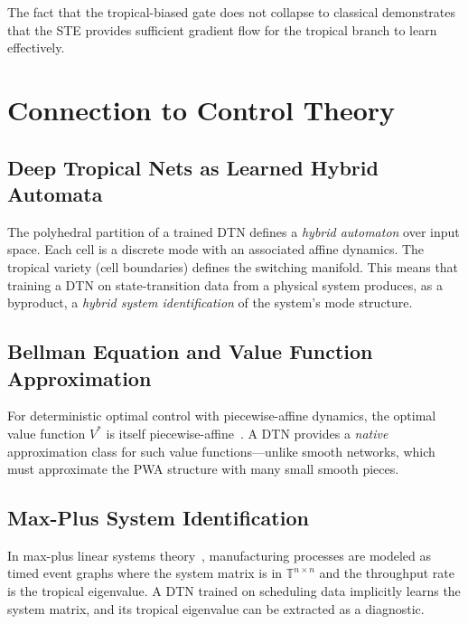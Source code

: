 \documentclass[11pt,twocolumn]{article}
\newcommand{\T}{\mathbb{T}}
\begin{document}
The fact that the tropical-biased gate does not collapse to classical
demonstrates that the STE provides sufficient gradient flow for the tropical
branch to learn effectively.

\section{Connection to Control Theory}\label{sec:control}

\subsection{Deep Tropical Nets as Learned Hybrid Automata}

The polyhedral partition of a trained DTN defines a \emph{hybrid automaton}
over input space. Each cell is a discrete mode with an associated affine
dynamics. The tropical variety (cell boundaries) defines the switching
manifold. This means that training a DTN on state-transition data from a
physical system produces, as a byproduct, a \emph{hybrid system identification}
of the system's mode structure.

\subsection{Bellman Equation and Value Function Approximation}

For deterministic optimal control with piecewise-affine dynamics, the optimal
value function $V^*$ is itself
piecewise-affine~\cite{borrelli2017predictive}. A DTN provides a
\emph{native} approximation class for such value functions---unlike smooth
networks, which must approximate the PWA structure with many small smooth
pieces.

\subsection{Max-Plus System Identification}

In max-plus linear systems theory~\cite{baccelli1992synchronization},
manufacturing processes are modeled as timed event graphs where the system
matrix is in $\T^{n \times n}$ and the throughput rate is the tropical
eigenvalue. A DTN trained on scheduling data implicitly learns the system
matrix, and its tropical eigenvalue can be extracted as a diagnostic.

\end{document}
